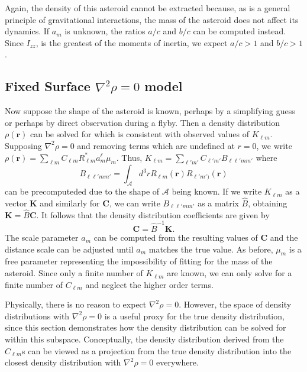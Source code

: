 \documentclass{aastex631}
\begin{document}
Again, the density of this asteroid cannot be extracted because, as is a general principle of gravitational interactions, the mass of the asteroid does not affect its dynamics. If $a_m$ is unknown, the ratios $a/c$ and $b/c$ can be computed instead. Since $I_{zz}$, is the greatest of the moments of inertia, we expect $a/c > 1$ and $b/c > 1$. 


\subsection{Fixed Surface $\nabla^2 \rho = 0$ model}
\label{sec:laplace-rho}
Now suppose the shape of the asteroid is known, perhaps by a simplifying guess or perhaps by direct observation during a flyby. Then a density distribution $\rho(\mathbf r)$ can be solved for which is consistent with observed values of $K_{\ell m}$. Supposing $\nabla^2 \rho = 0$ and removing terms which are undefined at $r=0$, we write $\rho(\mathbf r) = \sum_{\ell m} C_{\ell m} R_{\ell m}^* a_m^\ell \mu_m$. Thus, $K_{\ell m} = \sum_{\ell' m'} C_{\ell' m'} B_{\ell \ell' m m'}$ where
\begin{equation}
  B_{\ell \ell' m m'} = \int_{\mathcal{A}}d^3 r R_{\ell m}(\mathbf r) R_{\ell' m')}(\mathbf r)
  \label{eqn:blm}
\end{equation}
can be precomputeded due to the shape of $\mathcal{A}$ being known.
If we write $K_{\ell m}$ as a vector $\mathbf K$ and similarly for $\mathbf C$, we can write $B_{\ell \ell' m m'}$ as a matrix $\hat B$, obtaining $\mathbf K = \hat B \mathbf C$. It follows that the density distribution coefficients are given by
\begin{equation}
\mathbf C = \hat B^{-1} \mathbf K.
\end{equation}
The scale parameter $a_m$ can be computed from the resulting values of $\mathbf C$ and the distance scale can be adjusted until $a_m$ matches the true value. As before, $\mu_m$ is a free parameter representing the impossibility of fitting for the mass of the asteroid. Since only a finite number of $K_{\ell m}$ are known, we can only solve for a finite number of $C_{\ell m}$ and neglect the higher order terms.

Physically, there is no reason to expect $\nabla^2 \rho = 0$. However, the space of density distributions with $\nabla^2 \rho = 0$ is a useful proxy for the true density distribution, since this section demonstrates how the density distribution can be solved for within this subspace. Conceptually, the density distribution derived from the $C_{\ell m}$s can be viewed as a projection from the true density distribution into the closest density distribution with $\nabla^2 \rho = 0$ everywhere.
\end{document}
